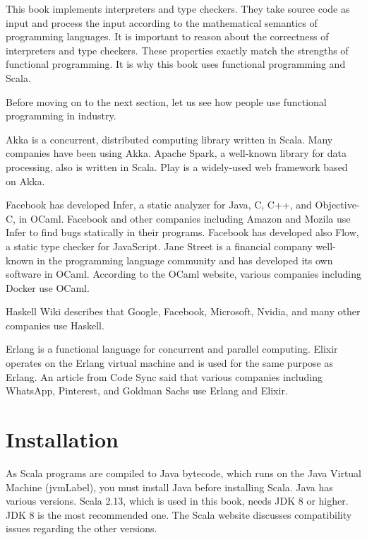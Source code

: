 This book implements interpreters and type checkers. They take source code as
input and process the input according to the mathematical semantics of programming
languages. It is important
to reason about the correctness of interpreters and type checkers. These
properties exactly match the strengths of functional programming. It is why
this book uses functional programming and Scala.

Before moving on to the next section,
let us see how people use functional programming in industry.

Akka is a concurrent,
distributed computing library written in Scala. Many companies have been using Akka.
Apache Spark, a well-known library for data
processing, also is written in Scala.
Play
is a widely-used web framework based on Akka.

Facebook has developed Infer, a static analyzer for Java,
C, C++, and Objective-C, in OCaml. Facebook and other companies including Amazon
and Mozila use Infer to find bugs statically in their programs. Facebook has
developed also Flow, a static type checker for JavaScript.
Jane Street is a financial company well-known in
the programming language community and has developed its own software in OCaml.
According to the OCaml website,
various companies including Docker use OCaml.

Haskell Wiki describes that Google,
Facebook, Microsoft, Nvidia, and many other companies use Haskell.

Erlang is a functional language for concurrent and parallel computing. Elixir
operates on the Erlang virtual machine and is used for the same purpose as Erlang.
An article from Code
Sync
said that various companies including WhatsApp, Pinterest, and Goldman Sachs
use Erlang and Elixir.

\section{Installation}

As Scala programs are compiled to Java bytecode, which runs on the Java Virtual
Machine (\acrshort{jvmLabel}), you must
install Java before installing Scala. Java has various versions. Scala 2.13,
which is used in this book, needs JDK 8 or higher. JDK 8 is the most recommended
one. The Scala website
discusses compatibility issues regarding the other versions.

